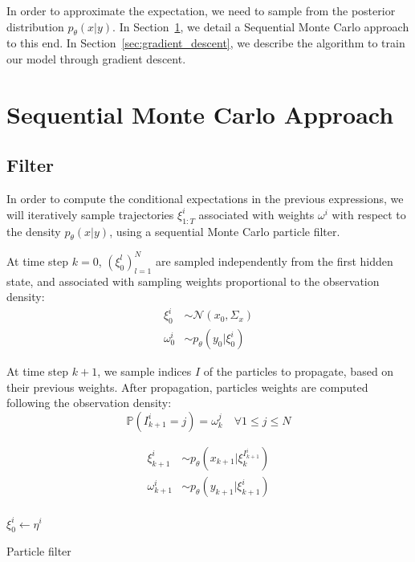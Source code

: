 \documentclass[10pt,a4paper]{report}
\begin{document}
In order to approximate the expectation, we need to sample from the posterior distribution $p_\theta(x|y)$.
In Section~\ref{sec:smc}, we detail a Sequential Monte Carlo approach to this end.
In Section~\ref{sec:gradient_descent}, we describe the algorithm to train our model through gradient descent.


\section{Sequential Monte Carlo Approach}
\label{sec:smc}

\subsection{Filter}
In order to compute the conditional expectations in the previous expressions, we will iteratively sample trajectories $\xi_{1:T}^i$ associated with weights $\omega^i$ with respect to the density $p_\theta(x | y)$, using a sequential Monte Carlo particle filter.

At time step $k=0$, $(\xi_0^l)_{l=1}^N$ are sampled independently from the first hidden state, and associated with sampling weights proportional to the observation density:
\begin{align*}
	\xi_0^i    & \sim \mathcal{N}(x_0, \Sigma_x) \\
	\omega_0^i & \sim p_\theta(y_0|\xi_0^i)
\end{align*}

At time step $k+1$, we sample indices $I$ of the particles to propagate, based on their previous weights.
After propagation, particles weights are computed following the observation density:
$$\mathbb{P}(I_{k+1}^i=j) = \omega_k^j \quad \forall 1 \leq j \leq N$$

\begin{align*}
	\xi_{k+1}^i    & \sim p_\theta(x_{k+1}|\xi_k^{I_{k+1}^i}) \\
	\omega_{k+1}^i & \sim p_\theta(y_{k+1}|\xi_{k+1}^i)       \\
\end{align*}

\begin{algorithm}
	$\xi_0^i \gets \eta^i$\;
	\caption{Particle filter}
\end{algorithm}
\end{document}
